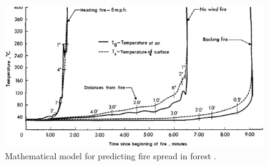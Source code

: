 \begin{figure}[here]
  \centering
      \includegraphics[width=1\textwidth]{theory/graphics/fire-prediction.jpg}
  \caption{Mathematical model for predicting fire spread in forest \cite{forest-spread-model}.}
  \label{fig:fire-prediction}
\end{figure}

